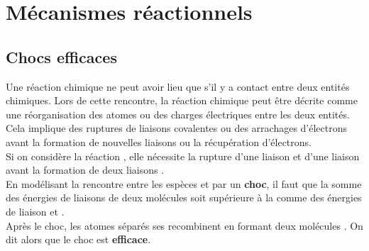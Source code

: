 \documentclass[a4paper,13pt,fleqn]{scrartcl}%
\begin{document}
\newpage

\section{Mécanismes réactionnels}
	\subsection{Chocs efficaces}
Une réaction chimique ne peut avoir lieu que s'il y a contact entre deux entités chimiques. Lors de cette rencontre, la réaction chimique peut être décrite comme une réorganisation des atomes ou des charges électriques entre les deux entités. Cela implique des ruptures de liaisons covalentes ou des arrachages d'électrons avant la formation de nouvelles liaisons ou la récupération d'électrons.\\
Si on considère la réaction , elle nécessite la rupture d'une liaison  et d'une liaison  avant la formation de deux liaisons .\\
En modélisant la rencontre entre les espèces  et  par un \textbf{choc}, il faut que la somme des énergies de liaisons de deux molécules soit supérieure à la comme des énergies de liaison  et .\\
Après le choc, les atomes séparés ses recombinent en formant deux molécules . On dit alors que le choc est \textbf{efficace}.
\end{document}
